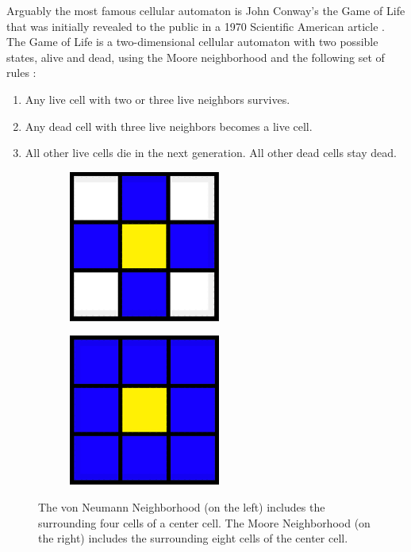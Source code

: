 \documentclass[12pt]{article}
\numberwithin{figure}{section} %
\begin{document}
Arguably the most famous cellular automaton is John Conway’s the Game of Life that was initially revealed to the public in a 1970 Scientific American article \cite{Scientific American}. The Game of Life is a two-dimensional cellular automaton with two possible states, alive and dead, using the Moore neighborhood and the following set of rules \cite{The Game of Life}: 
\begin{enumerate}[topsep=0pt,itemsep=-1ex,partopsep=1ex,parsep=1ex]
\item Any live cell with two or three live neighbors survives. 
\item Any dead cell with three live neighbors becomes a live cell. 
\item All other live cells die in the next generation. All other dead cells stay dead. 
\end{enumerate}

\begin{figure}[H]
	\begin{subfigure}{0.48\textwidth}
     		\centering
     		\includegraphics[width=.6\linewidth]{Section1/1}
   	\end{subfigure}\hfill
   	\begin{subfigure}{0.48\textwidth}
     		\centering
     		\includegraphics[width=.6\linewidth]{Section1/2}
   	\end{subfigure}
   	\caption[Neighborhood configuration]{The von Neumann Neighborhood (on the left) includes the surrounding four cells of a center cell. The Moore Neighborhood (on the right) includes the surrounding eight cells of the center cell.}
   	\vspace{-1.5em}
   	\label{fig:Neighborhood configuration}
\end{figure}
\end{document}
